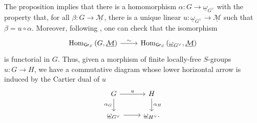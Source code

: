 \begin{rem}[]\label{rem:ReprMorExt}
	The proposition implies that there is
	a homomorphism $\alpha\colon G \to \underline{\omega}_{G^\vee}$
	with the property that, for all $\beta\colon G \to \underline{\mathcal{M}}$,
	there is a unique linear $u\colon \underline{\omega}_{G^\vee} \to \underline{\mathcal{M}}$
	such that $\beta = u \circ \alpha$.
	Moreover, following {\cite[Chapter IV, remark 1.6]{Messing}},
	one can check that the isomorphism
	\begin{equation*}
	\begin{tikzcd}[row sep = 0ex
		,/tikz/column 1/.append style={anchor=base east}
		,/tikz/column 2/.append style={anchor=base west}]
		\mathrm{Hom}_{\mathsf{Gr}_S} \left( G, \underline{\mathcal{M}} \right)
		\arrow[r, "\sim", rightarrow] &
		\mathrm{Hom}_{\mathsf{Gr}_S} \left( \underline{\omega}_{G^\vee}, \underline{\mathcal{M}} \right)
	\end{tikzcd}
	\end{equation*} 
	is functorial in $G$.
	Thus, given a morphism of finite locally-free $S$-groups $u\colon G \to H$,
	we have a commutative diagram whose lower horizontal arrow is
	induced by the Cartier dual of $u$
	\begin{equation}\label{diag:functorialityRepresent}
	\begin{tikzcd}
		G \arrow[r, "u", rightarrow] 
		\arrow[d, "\alpha_G"', rightarrow] &
		H \arrow[d, "\alpha_H", rightarrow] \\
		\underline{\omega}_{G^\vee} \arrow[r, "", rightarrow] &
		\underline{\omega}_{H^\vee}
	.\end{tikzcd}
	\end{equation}
\end{rem}



